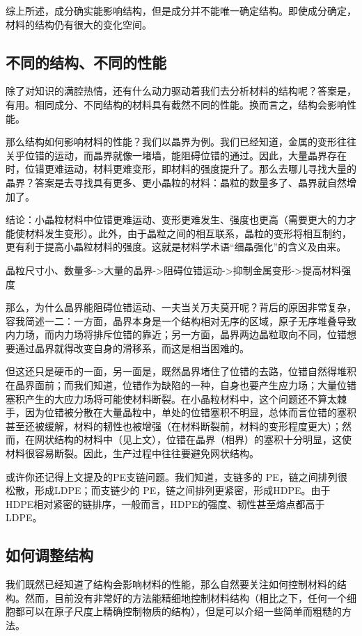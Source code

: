 综上所述，成分确实能影响结构，但是成分并不能唯一确定结构。即使成分确定，材料的结构仍有很大的变化空间。
 
\subsection{不同的结构、不同的性能}

除了对知识的满腔热情，还有什么动力驱动着我们去分析材料的结构呢？答案是，有用。相同成分、不同结构的材料具有截然不同的性能。换而言之，结构会影响性能。

那么结构如何影响材料的性能？我们以晶界为例。我们已经知道，金属的变形往往关乎位错的运动，而晶界就像一堵墙，能阻碍位错的通过。因此，大量晶界存在时，位错更难运动，材料更难变形，即材料的强度提升了。那么去哪儿寻找大量的晶界？答案是去寻找具有更多、更小晶粒的材料：晶粒的数量多了、晶界就自然增加了。

结论：小晶粒材料中位错更难运动、变形更难发生、强度也更高（需要更大的力才能使材料发生变形）。此外，由于晶粒之间的相互联系，晶粒的变形将相互制约，更有利于提高小晶粒材料的强度。这就是材料学术语“细晶强化”的含义及由来。

晶粒尺寸小、数量多->大量的晶界->阻碍位错运动->抑制金属变形->提高材料强度

那么，为什么晶界能阻碍位错运动、一夫当关万夫莫开呢？背后的原因非常复杂，容我简述一二：一方面，晶界本身是一个结构相对无序的区域，原子无序堆叠导致内力场，而内力场将排斥位错的靠近；另一方面，晶界两边晶粒取向不同，位错想要通过晶界就得改变自身的滑移系，而这是相当困难的。

但这还只是硬币的一面，另一面是，既然晶界堵住了位错的去路，位错自然得堆积在晶界面前；而我们知道，位错作为缺陷的一种，自身也要产生应力场；大量位错塞积产生的大应力场将可能使材料断裂。在小晶粒材料中，这个问题还不算太棘手，因为位错被分散在大量晶粒中，单处的位错塞积不明显，总体而言位错的塞积甚至还被缓解，材料的韧性也被增强（在材料断裂前，材料的变形程度更大）；然而，在网状结构的材料中（见上文），位错在晶界（相界）的塞积十分明显，这使材料很容易断裂。因此，生产过程中往往要避免网状结构。

或许你还记得上文提及的PE支链问题。我们知道，支链多的 PE，链之间排列很松散，形成LDPE；而支链少的 PE，链之间排列更紧密，形成HDPE。由于HDPE相对紧密的链排序，一般而言，HDPE的强度、韧性甚至熔点都高于LDPE。

\subsection{如何调整结构}

我们既然已经知道了结构会影响材料的性能，那么自然要关注如何控制材料的结构。然而，目前没有非常好的方法能精细地控制材料结构（相比之下，任何一个细胞都可以在原子尺度上精确控制物质的结构），但是可以介绍一些简单而粗糙的方法。

